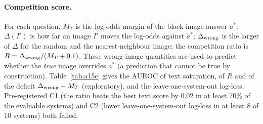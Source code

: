 \paragraph{Competition score.}
For each question, $M_T$ is the log-odds margin of the black-image answer $a^*$; $\Delta(I')$ is how far an image $I'$ moves the log-odds against $a^*$; $\Delta_{\rm wrong}$ is the larger of $\Delta$ for the random and the nearest-neighbour image; the competition ratio is $R=\Delta_{\rm wrong}/(M_T+0.1)$.
These wrong-image quantities are used to predict whether the \emph{true} image overrides $a^*$ (a prediction that cannot be true by construction).
Table~\ref{tab:a15c} gives the AUROC of text saturation, of $R$ and of the deficit $\Delta_{\rm wrong}-M_T$ (exploratory), and the leave-one-system-out log-loss.
Pre-registered C1 (the ratio beats the best text score by 0.02 in at least 70\% of the evaluable systems) and C2 (lower leave-one-system-out log-loss in at least 8 of 10 systems) both failed.

\begin{table}[h]
  \centering
  \footnotesize
  \setlength{\tabcolsep}{2.2pt}
  \caption{\textbf{Predicting visual overrides (A15).} Overr.: questions whose answer under the true image differs from the black-image answer. AUROC of text saturation (Sat.), of the pre-registered competition ratio (Ratio) and of the exploratory deficit; LL: leave-one-system-out log-loss of a logistic model on the text margin (text) and on the text margin plus wrong-image evidence (add.). The ratio is below saturation on Med-CMR (C1 and C2 failed); the additive model has the lower log-loss in 9 of 10 systems.}
  \label{tab:a15c}
\end{table}


